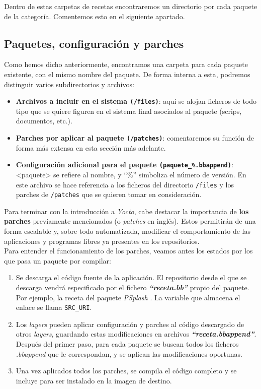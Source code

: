 Dentro de estas carpetas de recetas encontraremos un directorio por cada paquete de la categoría. Comentemos esto en el siguiente apartado.\\

\subsection{Paquetes, configuración y parches}

Como hemos dicho anteriormente, encontramos una carpeta para cada paquete existente, con el mismo nombre del paquete. De forma interna a esta, podremos distinguir varios subdirectorios y archivos:

\begin{itemize}
	\item \textbf{Archivos a incluir en el sistema \texttt{(/files)}}: aquí se alojan ficheros de todo tipo que se quiere figuren en el sistema final asociados al paquete (scrips, documentos, etc.).
	\item \textbf{Parches por aplicar al paquete \texttt{(/patches)}}: comentaremos su función de forma más extensa en esta sección más adelante.
	\item \textbf{Configuración adicional para el paquete \texttt{(paquete\_\%.bbappend)}}: <paquete> se refiere al nombre, y ``\%'' simboliza el número de versión. En este archivo se hace referencia a los ficheros del directorio \texttt{/files} y los parches de \texttt{/patches} que se quieren tomar en consideración.
\end{itemize}

Para terminar con la introducción a \textit{Yocto}, cabe destacar la importancia de \textbf{los parches} previamente mencionados (o \textit{patches} en inglés). Estos permitirán de una forma escalable y, sobre todo automatizada, modificar el comportamiento de las aplicaciones y programas libres ya presentes en los repositorios.\\

Para entender el funcionamiento de los parches, veamos antes los estados por los que pasa un paquete por compilar:

\begin{enumerate}
	\item Se descarga el código fuente de la aplicación. El repositorio desde el que se descarga vendrá especificado por el fichero \textbf{\textit{``receta.bb''}} propio del paquete. Por ejemplo, la receta del paquete \textit{PSplash} \cite{yocto-recipe-psplash}. La variable que almacena el enlace se llama \texttt{SRC\_URI}.
	\item Los \textit{layers} pueden aplicar configuración y parches al código descargado de otros \textit{layers}, guardando estas modificaciones en archivos \textbf{\textit{``receta.bbappend''}}. Después del primer paso, para cada paquete se buscan todos los ficheros \textit{.bbappend} que le correspondan, y se aplican las modificaciones oportunas.
	\item Una vez aplicados todos los parches, se compila el código completo y se incluye para ser instalado en la imagen de destino.
\end{enumerate}

